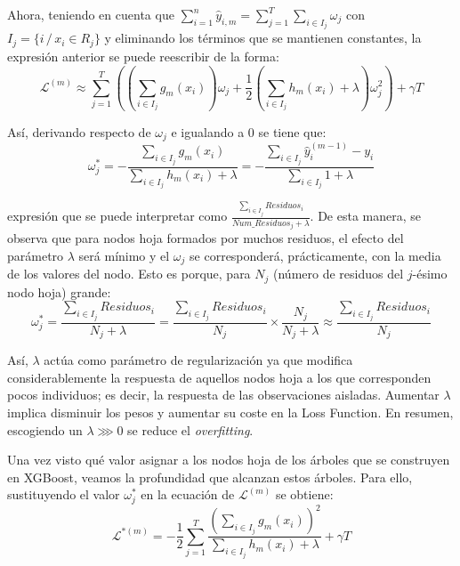 \documentclass[12pt,twoside]{article}
\begin{document}
Ahora, teniendo en cuenta que $ \displaystyle \sum_{i=1}^n \hat{y}_{i, m} = \sum_{j = 1}^T\sum_{i \in I_j} \omega_j$ con $I_j = \{ i \, / \, x_i \in R_j \}$ y eliminando los términos que se mantienen constantes, la expresión anterior se puede reescribir de la forma:
\begin{equation*}
\mathcal{L}^{(m)} \approx \sum_{j = 1}^T \left( (\sum_{i \in I_j} g_m(x_i))\omega_j + \frac{1}{2}(\sum_{i\in I_j} h_m(x_i) + \lambda)\omega_j^2 \right) + \gamma T
\end{equation*}

Así, derivando respecto de $\omega_j$ e igualando a 0 se tiene que:
\begin{equation*}
\omega_j^* = - \frac{\sum_{i \in I_j} g_m(x_i)}{\sum_{i \in I_j} h_m(x_i) + \lambda} = - \frac{\sum_{i \in I_j} \hat{y}_i^{(m-1)} - y_i}{\sum_{i \in I_j} 1 + \lambda}
\end{equation*}

\noindent
expresión que se puede interpretar como $\frac{\sum_{i \in I_j} Residuos_i}{Num\_Residuos_j + \lambda}$. De esta manera, se observa que para nodos hoja formados por muchos residuos, el efecto del parámetro $\lambda$ será mínimo y el $\omega_j$ se corresponderá, prácticamente, con la media de los valores del nodo. Esto es porque, para $N_j$ (número de residuos del $j$-ésimo nodo hoja) grande:
\begin{equation*}
\omega_j^* = \frac{\sum_{i \in I_j} Residuos_i}{N_j + \lambda} = \frac{\sum_{i \in I_j} Residuos_i}{N_j} \times \frac{N_j}{N_j + \lambda} \approx \frac{\sum_{i \in I_j} Residuos_i}{N_j}
\end{equation*}

Así, $\lambda$ actúa como parámetro de regularización ya que modifica considerablemente la respuesta de aquellos nodos hoja a los que corresponden pocos individuos; es decir, la respuesta de las observaciones aisladas. Aumentar $\lambda$ implica disminuir los pesos y aumentar su coste en la Loss Function. En resumen, escogiendo un $\lambda \ggg 0$ se reduce el \textit{overfitting}.

Una vez visto qué valor asignar a los nodos hoja de los árboles que se construyen en XGBoost, veamos la profundidad que alcanzan estos árboles. Para ello, sustituyendo el valor $\omega_j^*$ en la ecuación de $\mathcal{L}^{(m)}$ se obtiene:
\begin{equation*}
\mathcal{L}^{*(m)} = - \frac{1}{2} \sum_{j = 1}^T \frac{\left( \sum_{i \in I_j} g_m(x_i) \right)^2}{\sum_{i \in I_j} h_m(x_i) + \lambda} + \gamma T 
\end{equation*}
\end{document}
